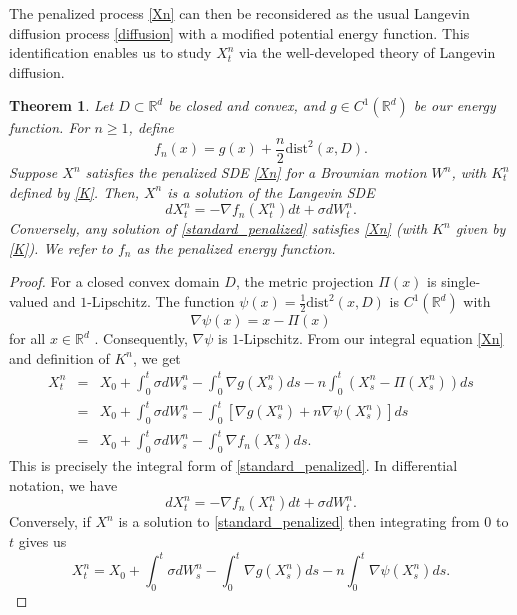\documentclass[amsfonts, reqno]{amsart}
\newtheorem{thm}{Theorem}[section]
\theoremstyle{definition}
\theoremstyle{remark}
\newcommand{\bbR}{\mathbb{R}}
\newcommand{\dist}{\text{dist}}
\numberwithin{equation}{section}
\begin{document}
The penalized process \eqref{Xn} can then be reconsidered as the usual Langevin diffusion process \eqref{diffusion} with a modified potential energy function. This identification enables us to study $X_t^n$ via the well-developed theory 
of Langevin diffusion.

\begin{thm}\label{langevin form}
Let $D \subset \bbR^d$ be closed and convex, and $g \in C^1(\bbR^d)$ be our energy function. For $n \geq 1$, define $$f_n(x)= g(x) + \frac{n}{2} \dist^2(x, D).$$ Suppose $X^n$ satisfies the penalized SDE \eqref{Xn} for a Brownian motion $W^n$, with $K^n_t$ defined by \eqref{K}. Then, $X^n$ is a solution of the Langevin SDE \begin{equation} \label{standard_penalized}
dX_t^n = -\nabla f_n(X_t^n) dt + \sigma dW_t^n.
\end{equation}
Conversely, any solution of \eqref{standard_penalized} satisfies \eqref{Xn} (with $K^n$ given by \eqref{K}).
We refer to $f_n$ as the penalized energy function.
\end{thm}
\begin{proof}
    For a closed convex domain $D$, the metric projection $\Pi(x)$ is single-valued and $1$-Lipschitz. The function $\psi(x) = \frac{1}{2}\dist^2(x,D)$ is $C^1(\bbR^d)$ with \[
    \nabla\psi(x) = x - \Pi(x)
    \] for all $x \in \bbR^d$ \cite{Balestro2019}. Consequently, $\nabla\psi$ is $1$-Lipschitz. From our integral equation \eqref{Xn} and definition of $K^n$, we get 
    \begin{eqnarray*}
        X^n_t & = & X_0 + \int_{0}^{t} \sigma dW_s^n -\int_{0}^{t}\nabla g(X_s^n) ds -n\int_0^t (X_s^n - \Pi(X_s^n)) ds \\
        & = & X_0 + \int_{0}^{t} \sigma dW_s^n - \int_0^t\left[ \nabla g(X_s^n) + n\nabla\psi(X_s^n) \right] ds \\
        & = & X_0 + \int_0^t \sigma dW_s^n - \int_0^t \nabla f_n(X_s^n) ds.
    \end{eqnarray*}
    This is precisely the integral form of \eqref{standard_penalized}. In differential notation, we have \[
    dX_t^n = -\nabla f_n(X_t^n) dt + \sigma dW_t^n.
    \]
    Conversely, if $X^n$ is a solution to \eqref{standard_penalized} then integrating from $0$ to $t$ gives us \[
    X_t^n = X_0 + \int_{0}^{t} \sigma dW_s^n -\int_{0}^{t}\nabla g(X_s^n) ds -n\int_0^t \nabla\psi(X_s^n) ds.
    \]
\end{proof}
\end{document}
